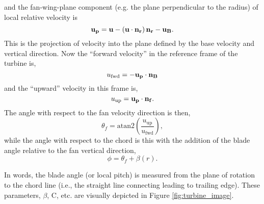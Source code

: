

and the fan-wing-plane component (e.g. the plane perpendicular to the 
radius) of local relative velocity is
\begin{equation}
{\bf u_p} = {\bf u} - ({\bf u}\cdot {\bf n_r}) \, {\bf n_r} - {\bf u_B}. 
\end{equation}
This is the projection of velocity into the plane defined by the base
velocity and vertical direction. Now the ``forward velocity'' in the
reference frame of the turbine is,  
\begin{equation}
u_{\text{fwd}} = -{\bf u_p} \cdot {\bf n_B}
\end{equation}
and the ``upward'' velocity in this frame is, 
\begin{equation}
u_{\text{up}} = {\bf u_p} \cdot {\bf n_f}. 
\end{equation}
The angle with respect to the fan velocity direction is then, 
\begin{equation}
 \theta_f = \text{atan2}\left(\frac{ u_{\text{up} }}{
			 u_{\text{fwd}}}\right), 
  \label{eq:fan_direction}
\end{equation}
while the angle with respect to the chord is this with the addition of
the blade angle relative to the fan vertical direction, 
\begin{equation}
 \phi = \theta_f + \beta(r).
\end{equation}

In words, the blade angle (or local pitch) is measured from the plane of
rotation to the chord line (i.e., the straight line connecting leading
to trailing edge). These parameters, $\beta$, C, etc. are visually
depicted in Figure \ref{fig:turbine_image}.  

